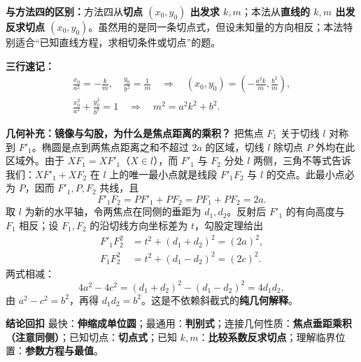 \begin{proofbox}
\textbf{与方法四的区别：}方法四从\textbf{切点 $(x_0,y_0)$ 出发求 $k,m$}；本法从\textbf{直线的 $k,m$ 出发反求切点 $(x_0,y_0)$}。虽然用的是同一条切点式，但设未知量的方向相反；本法特别适合“已知直线方程，求相切条件或切点”的题。

\textbf{三行速记：}
\[
\begin{gathered}
 \frac{x_0}{a^2}=-\frac{k}{m},\quad \frac{y_0}{b^2}=\frac1m
 \quad\Longrightarrow\quad
 (x_0,y_0)=\left(-\frac{a^2k}{m},\frac{b^2}{m}\right),\\
 \frac{x_0^2}{a^2}+\frac{y_0^2}{b^2}=1
 \quad\Longrightarrow\quad
 \boxed{m^2=a^2k^2+b^2}.
\end{gathered}
\]

\textbf{\textcolor{CProof}{几何补充：镜像与勾股，为什么是焦点距离的乘积？}}
把焦点 $F_1$ 关于切线 $l$ 对称到 $F'_1$。椭圆是点到两焦点距离之和不超过 $2a$ 的区域，切线 $l$ 除切点 $P$ 外均在此区域外。由于 $XF_1=XF'_1$（$X\in l$），而 $F'_1$ 与 $F_2$ 分处 $l$ 两侧，三角不等式告诉我们：$XF'_1+XF_2$ 在 $l$ 上的唯一最小点就是线段 $F'_1F_2$ 与 $l$ 的交点。此最小点必为 $P$，因而 $F'_1,P,F_2$ 共线，且
\[
 F'_1F_2=PF'_1+PF_2=PF_1+PF_2=2a.
\]
取 $l$ 为新的水平轴，令两焦点在同侧的垂距为 $d_1,d_2$。反射后 $F'_1$ 的有向高度与 $F_1$ 相反；设 $F_1,F_2$ 的沿切线方向坐标差为 $t$，勾股定理给出
\[
 \begin{aligned}
 F'_1F_2^2&=t^2+(d_1+d_2)^2=(2a)^2,\\
 F_1F_2^2&=t^2+(d_1-d_2)^2=(2c)^2.
 \end{aligned}
\]
两式相减：
\[
 4a^2-4c^2=(d_1+d_2)^2-(d_1-d_2)^2=4d_1d_2,
\]
由 $a^2-c^2=b^2$，再得 $\boxed{d_1d_2=b^2}$。这是不依赖斜截式的\textbf{纯几何解释}。

\medskip
\textbf{\textcolor{CProof}{结论回扣}}
最快：\textbf{伸缩成单位圆}；最通用：\textbf{判别式}；连接几何性质：\textbf{焦点垂距乘积（注意同侧）}；已知切点：\textbf{切点式}；已知 $k,m$：\textbf{比较系数反求切点}；理解临界位置：\textbf{参数方程与最值}。
\end{proofbox}
